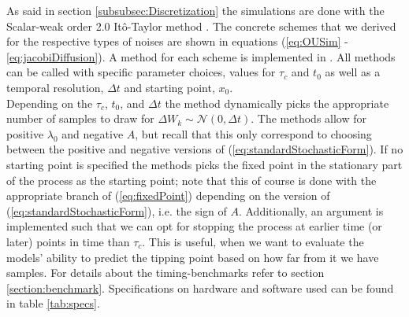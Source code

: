 As said in section \ref{subsubsec:Discretization} the simulations are done with the Scalar-weak order 2.0 Itô-Taylor method \cite[algorithm 8.5]{Srkk2019}. The concrete schemes that we derived for the respective types of noises are shown in equations (\ref{eq:OUSim} - \ref{eq:jacobiDiffusion}). A method for each scheme is implemented in . All methods can be called with specific parameter choices, values for $\tau_c$ and $t_0$ as well as a temporal resolution, $\Delta t$ and starting point, $x_0$. \\Depending on the $\tau_c$, $t_0$, and $\Delta t$ the method dynamically picks the appropriate number of samples to draw for $\Delta W_k\sim\mathcal{N}\left(0,\Delta t\right)$. The methods allow for positive $\lambda_0$ and negative $A$, but recall that this only correspond to choosing between the positive and negative versions of (\ref{eq:standardStochasticForm}). If no starting point is specified the methods picks the fixed point in the stationary part of the process as the starting point; note that this of course is done with the appropriate branch of (\ref{eq:fixedPoint}) depending on the version of (\ref{eq:standardStochasticForm}), i.e. the sign of $A$. Additionally, an argument is implemented such that we can opt for stopping the process at earlier time (or later) points in time than $\tau_c$. This is useful, when we want to evaluate the models' ability to predict the tipping point based on how far from it we have samples. For details about the timing-benchmarks refer to section \ref{section:benchmark}. Specifications on hardware and software used can be found in table \ref{tab:specs}. 
